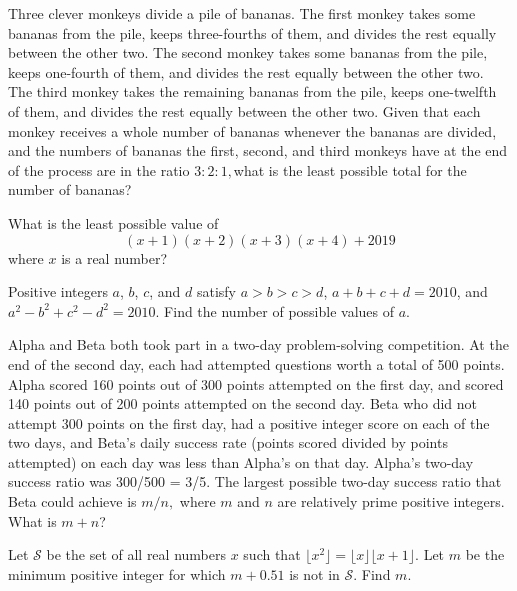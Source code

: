 \documentclass{article}
\begin{document}
\begin{prob}[AIME II 2004/6]{3}
Three clever monkeys divide a pile of bananas. The first monkey takes some bananas from the pile, keeps three-fourths of them, and divides the rest equally between the other two. The second monkey takes some bananas from the pile, keeps one-fourth of them, and divides the rest equally between the other two. The third monkey takes the remaining bananas from the pile, keeps one-twelfth of them, and divides the rest equally between the other two. Given that each monkey receives a whole number of bananas whenever the bananas are divided, and the numbers of bananas the first, second, and third monkeys have at the end of the process are in the ratio $3: 2: 1,$what is the least possible total for the number of bananas?
\end{prob} 

\begin{prob}[AMC 10A 2019/19]{3}
What is the least possible value of\[(x+1)(x+2)(x+3)(x+4)+2019\]where $x$ is a real number?
\end{prob}  

\begin{prob}[AIME I 2010/5]{3}
Positive integers $a$, $b$, $c$, and $d$ satisfy $a > b > c > d$, $a + b + c + d = 2010$, and $a^2 - b^2 + c^2 - d^2 = 2010$. Find the number of possible values of $a$.
\end{prob} 

\begin{prob}[AIME I 2004/5]{4}
Alpha and Beta both took part in a two-day problem-solving competition. At the end of the second day, each had attempted questions worth a total of 500 points. Alpha scored 160 points out of 300 points attempted on the first day, and scored 140 points out of 200 points attempted on the second day. Beta who did not attempt 300 points on the first day, had a positive integer score on each of the two days, and Beta's daily success rate (points scored divided by points attempted) on each day was less than Alpha's on that day. Alpha's two-day success ratio was 300/500 = 3/5. The largest possible two-day success ratio that Beta could achieve is $m/n,$ where $m$ and $n$ are relatively prime positive integers. What is $m+n$?
\end{prob} 

\begin{prob}[]{4}
Let $\mathcal{S}$ be the set of all real numbers $x$ such that $\lfloor x^2\rfloor=\lfloor x\rfloor\lfloor x+1\rfloor$. Let $m$ be the minimum positive integer for which $m+0.51$ is not in $\mathcal{S}$. Find $m$. 
\end{prob} 
\end{document}
